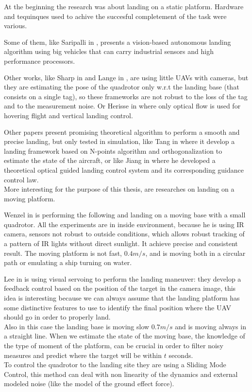 At the beginning the research was about landing on a static platform. Hardware and tequinques used to achive the succesful completement of the task were various.

Some of them, like Saripalli in \cite{saripalli2002vision}, presents a vision-based autonomous landing algorithm using big vehicles that can carry industrial sensors and high performance processors.

Other works, like Sharp in \cite{sharp2001vision} and Lange in \cite{lange2008autonomous}, are using little UAVs with cameras, but they are estimating the pose of the quadrotor only w.r.t the landing base (that consists on a single tag), so these frameworks are not robust to the loss of the tag and to the measurement noise. Or Herisse in \cite{herisse2008hovering} where only optical flow is used for hovering flight and vertical landing control.

Other papers present promising theoretical algorithm to perform a smooth and precise landing, but only tested in simulation, like Tang in \cite{tang2011uav} where it develop a landing framework based on N-points algorithm and orthogonalization to estimate the state of the aircraft, or like Jiang in \cite{jian2012automatic} where he developed a theoretical optical guided landing control system and its corresponding guidance control law.\\


More interesting for the purpose of this thesis, are researches on landing on a moving platform.

Wenzel in \cite{wenzel2011automatic} is performing the following and landing on a moving base with a small quadrotor. All the experiments are in inside environment, because he is using IR camera, sensors not robust to outside conditions, which allows robust tracking of a pattern of IR lights without direct sunlight. It achieve precise and consistent result. The moving platform is not fast, $0.4m/s$, and is moving both in a circular path or emulating a ship turning on water.

Lee in \cite{lee2012autonomous} is using visual servoing to perform the landing maneuver: they develop a feedback control based on the position of the target in the camera image, this idea is interesting because we can always assume that the landing platform has some distinctive features to use to identify the final position where the UAV should go in order to properly land.\\
Also in this case the landing base is moving slow $0.7m/s$ and is moving always in a straight line. When we estimate the state of the moving base, the knowledge of the type of moment of the platform, can be crucial in order to filter noisy measures and predict where the target will be within $t$ seconds.\\
To control the quadrotor to the landing site they are using a Sliding Mode Control, this method can deal with non linearity of the dynamics and external modeled noise (like the model of the ground effect force).

